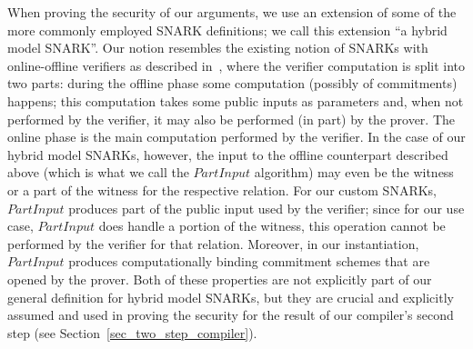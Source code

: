 \noindent When proving the security of our arguments, we use an extension of some of the more commonly employed SNARK definitions; we call this extension ``a hybrid model SNARK''. 
Our notion resembles the existing notion of SNARKs with online-offline verifiers as described in~\cite{HP_paper}, where the verifier computation is split into 
two parts: during the offline phase some computation (possibly of commitments) happens; this computation takes some public inputs as parameters and, when not 
performed by the verifier, it may also be performed (in part) by the prover. The online phase is the main computation performed by the verifier. In the case of our hybrid 
model SNARKs, however, the input to the offline counterpart described above (which is what we call the $\mathit{PartInput}$ algorithm) may even be the witness or 
a part of the witness for the respective relation. For our custom SNARKs, $\mathit{PartInput}$ produces part of the public input used by the verifier; 
since for our use case, $\mathit{PartInput}$ does handle a portion of the witness, this operation cannot be performed by the verifier for that relation. 
Moreover, in our instantiation, $\mathit{PartInput}$ produces computationally binding commitment schemes that are opened by the prover. Both of these properties 
are not explicitly part of our general definition for hybrid model SNARKs, but they are crucial and explicitly assumed and used 
in proving the security for the result of our compiler's second step (see Section~\ref{sec_two_step_compiler}).


%




